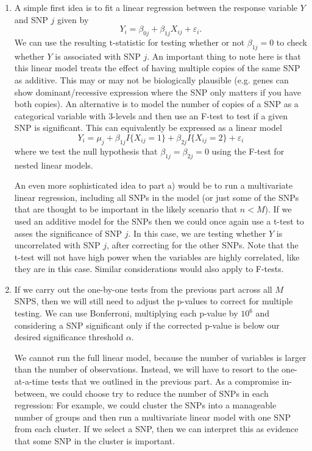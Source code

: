 \begin{enumerate}[label=(\alph*)]
\item
  A simple first idea is to fit a linear regression between the response variable $Y$ and SNP $j$ given by $$Y_i = \beta_{0j}+\beta_{1j} X_{ij} +\varepsilon_i.$$ We can use the resulting t-statistic for testing whether or not $\beta_{1j} =0$ to check whether $Y$ is associated with SNP $j$. An important thing to note here is that this linear model treats the effect of having multiple copies of the same SNP as additive. This may or may not be biologically plausible (e.g. genes can show dominant/recessive expression where the SNP only matters if you have both copies). An alternative is to model the number of copies of a SNP as a categorical variable with 3-levels and then use an F-test to test if a given SNP is significant. This can equivalently be expressed as a linear model $$Y_i = \mu_{j} + \beta_{1j} I \{X_{ij} =1 \} + \beta_{2j} I \{X_{ij} =2 \} +\varepsilon_i$$ where we test the null hypothesis that $ \beta_{1j}=\beta_{2j}=0$ using the F-test for nested linear models.
  
 An even more sophisticated idea to part a) would be to run a multivariate linear regression, including all SNPs in the model (or just some of the SNPs that are thought to be important in the likely scenario that $n<M$). If we used an additive model for the SNPs then we could once again use a t-test to asses the significance of SNP $j$. In this case, we are testing whether $Y$ is uncorrelated with SNP $j$, after correcting for the other SNPs. Note that the t-test will not have high power when the variables are highly correlated, like they are in this case. Similar considerations would also apply to F-tests.

\item
  If we carry out the one-by-one tests from the previous part across all $M$ SNPS, then we will still need to adjust the p-values to correct for multiple testing. We can use Bonferroni, multiplying each p-value by $10^6$ and considering a SNP significant only if the corrected p-value is below our desired significance threshold $\alpha$.

  We cannot run the full linear model, because the number of variables is larger than the number of observations. Instead, we will have to resort to the one-at-a-time tests that we outlined in the previous part. As a compromise in-between, we could choose try to reduce the number of SNPs in each regression: For example, we could cluster the SNPs into a manageable number of groups and then run a multivariate linear model with one SNP from each cluster. If we select a SNP, then we can interpret this as evidence that some SNP in the cluster is important.


\end{enumerate}
